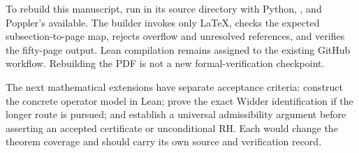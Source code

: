 To rebuild this manuscript, run  in its source
directory with Python, , and Poppler's 
available. The builder invokes only LaTeX, checks the expected
subsection-to-page map, rejects overflow and unresolved references,
and verifies the fifty-page output. Lean compilation remains assigned
to the existing GitHub workflow. Rebuilding the PDF is not a new
formal-verification checkpoint.

The next mathematical extensions have separate acceptance criteria:
construct the concrete operator model in Lean; prove the exact Widder
identification if the longer route is pursued; and establish a
universal admissibility argument before asserting an accepted
certificate or unconditional RH. Each would change the theorem
coverage and should carry its own source and verification record.
